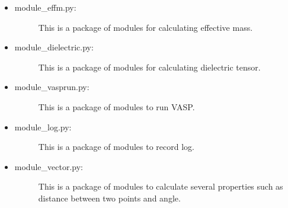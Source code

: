 \documentclass[letterpaper,10pt,english]{sphinxmanual}
\begin{document}
\begin{itemize}
\item {} \begin{description}
\item[{module\_effm.py:}] \leavevmode
This is a package of modules for calculating effective mass.

\end{description}

\item {} \begin{description}
\item[{module\_dielectric.py:}] \leavevmode
This is a package of modules for calculating dielectric tensor.

\end{description}

\item {} \begin{description}
\item[{module\_vasprun.py:}] \leavevmode
This is a package of modules to run VASP.

\end{description}

\item {} \begin{description}
\item[{module\_log.py:}] \leavevmode
This is a package of modules to record log.

\end{description}

\item {} \begin{description}
\item[{module\_vector.py:}] \leavevmode
This is a package of modules to calculate several properties such as distance between two points and angle.

\end{description}

\end{itemize}
\end{document}
